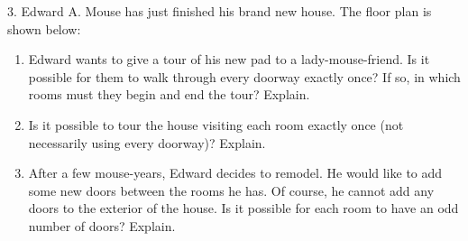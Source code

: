 \documentclass[10pt,]{book}
\theoremstyle{plain}
\theoremstyle{definition}
\numberwithin{equation}{chapter}
\begin{document}
\begin{exerciselist}
\par\smallskip
\item[3.]\hypertarget{exercise-305}{}
        Edward A. Mouse has just finished his brand new house. The floor plan is shown below:
      \leavevmode%
\begin{figure}
\centering
{
}
\end{figure}

      \leavevmode%
\begin{enumerate}[label=(\alph*)]
\item\hypertarget{li-800}{}
          Edward wants to give a tour of his new pad to a lady-mouse-friend. Is it possible for them to walk through every doorway exactly once? If so, in which rooms must they begin and end the tour? Explain.


\item\hypertarget{li-801}{}
          Is it possible to tour the house visiting each room exactly once (not necessarily using every doorway)? Explain.



\item\hypertarget{li-802}{}
          After a few mouse-years, Edward decides to remodel. He would like to add some new doors between the rooms he has. Of course, he cannot add any doors to the exterior of the house. Is it possible for each room to have an odd number of doors? Explain.


\end{enumerate}


\end{exerciselist}
\end{document}
